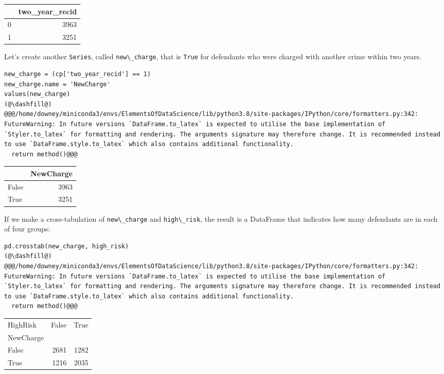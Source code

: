\begin{tabular}{lr}
\midrule
{} &  two\_year\_recid \\
\midrule
0 &            3963 \\
1 &            3251 \\
\midrule
\end{tabular}

Let's create another \passthrough{\lstinline!Series!}, called
\passthrough{\lstinline!new\_charge!}, that is
\passthrough{\lstinline!True!} for defendants who were charged with
another crime within two years.

\begin{lstlisting}[]
new_charge = (cp['two_year_recid'] == 1)
new_charge.name = 'NewCharge'
values(new_charge)
(@\dashfill@)
@@@/home/downey/miniconda3/envs/ElementsOfDataScience/lib/python3.8/site-packages/IPython/core/formatters.py:342: FutureWarning: In future versions `DataFrame.to_latex` is expected to utilise the base implementation of `Styler.to_latex` for formatting and rendering. The arguments signature may therefore change. It is recommended instead to use `DataFrame.style.to_latex` which also contains additional functionality.
  return method()@@@
\end{lstlisting}

\begin{tabular}{lr}
\midrule
{} &  NewCharge \\
\midrule
False &       3963 \\
True  &       3251 \\
\midrule
\end{tabular}

If we make a cross-tabulation of \passthrough{\lstinline!new\_charge!}
and \passthrough{\lstinline!high\_risk!}, the result is a DataFrame that
indicates how many defendants are in each of four groups:

\begin{lstlisting}[]
pd.crosstab(new_charge, high_risk)
(@\dashfill@)
@@@/home/downey/miniconda3/envs/ElementsOfDataScience/lib/python3.8/site-packages/IPython/core/formatters.py:342: FutureWarning: In future versions `DataFrame.to_latex` is expected to utilise the base implementation of `Styler.to_latex` for formatting and rendering. The arguments signature may therefore change. It is recommended instead to use `DataFrame.style.to_latex` which also contains additional functionality.
  return method()@@@
\end{lstlisting}

\begin{tabular}{lrr}
\midrule
HighRisk &  False &  True  \\
NewCharge &        &        \\
\midrule
False     &   2681 &   1282 \\
True      &   1216 &   2035 \\
\midrule
\end{tabular}

